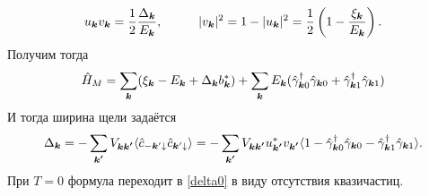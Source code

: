 \begin{equation*}
	u_{{\boldsymbol{k}}} v_{{\boldsymbol{k}}} = \frac{1}{2} \frac{\Delta_{{\boldsymbol{k}}}}{E_{{\boldsymbol{k}}}},
	\hspace{1.0 cm}
	|v_{{\boldsymbol{k}}}|^2 = 1 - |u_{{\boldsymbol{k}}}|^2 = \frac{1}{2} \left(1 - \frac{\xi_{{\boldsymbol{k}}}}{E_{{\boldsymbol{k}}}}\right).
\end{equation*}
Получим тогда
\begin{equation*}
	\hat{H}_M = \sum_{{\boldsymbol{k}}} (\xi_{{\boldsymbol{k}}} - E_{{\boldsymbol{k}}} + \Delta_{{\boldsymbol{k}}} b_{{\boldsymbol{k}}}^*) + \sum_{{\boldsymbol{k}}} E_{{\boldsymbol{k}}} (\hat{\gamma}_{{\boldsymbol{k}}0}^\dagger \hat{\gamma}_{{\boldsymbol{k}} 0} + \hat{\gamma}_{{\boldsymbol{k}} 1}^\dagger \hat{\gamma}_{{\boldsymbol{k}} 1})
\end{equation*}
И тогда ширина щели задаётся
\begin{equation*}
	\Delta_{{\boldsymbol{k}}} = - \sum_{{\boldsymbol{k'}}} V_{{\boldsymbol{k}} {\boldsymbol{k'}}} \langle \hat{c}_{-{\boldsymbol{k}}'\downarrow} \hat{c}_{{\boldsymbol{k}}'\downarrow} \rangle
	=
	- \sum_{{\boldsymbol{k'}}} V_{{\boldsymbol{k}} {\boldsymbol{k'}}} u_{{\boldsymbol{k'}}}^* v_{{\boldsymbol{k'}}} \langle 1 - \hat{\gamma}_{{\boldsymbol{k}}0}^\dagger \hat{\gamma}_{{\boldsymbol{k}} 0} - \hat{\gamma}_{{\boldsymbol{k}} 1}^\dagger \hat{\gamma}_{{\boldsymbol{k}} 1}\rangle.
\end{equation*} 
При $T=0$ формула переходит в \eqref{delta0} в виду отсутствия квазичастиц.
